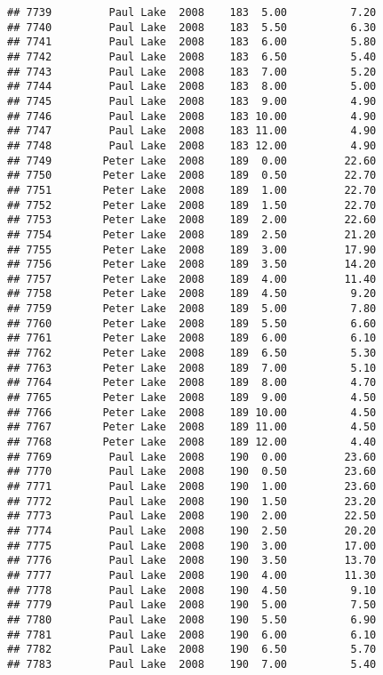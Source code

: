 \documentclass[
]{article}
\begin{document}
\begin{verbatim}
## 7739         Paul Lake  2008    183  5.00          7.20
## 7740         Paul Lake  2008    183  5.50          6.30
## 7741         Paul Lake  2008    183  6.00          5.80
## 7742         Paul Lake  2008    183  6.50          5.40
## 7743         Paul Lake  2008    183  7.00          5.20
## 7744         Paul Lake  2008    183  8.00          5.00
## 7745         Paul Lake  2008    183  9.00          4.90
## 7746         Paul Lake  2008    183 10.00          4.90
## 7747         Paul Lake  2008    183 11.00          4.90
## 7748         Paul Lake  2008    183 12.00          4.90
## 7749        Peter Lake  2008    189  0.00         22.60
## 7750        Peter Lake  2008    189  0.50         22.70
## 7751        Peter Lake  2008    189  1.00         22.70
## 7752        Peter Lake  2008    189  1.50         22.70
## 7753        Peter Lake  2008    189  2.00         22.60
## 7754        Peter Lake  2008    189  2.50         21.20
## 7755        Peter Lake  2008    189  3.00         17.90
## 7756        Peter Lake  2008    189  3.50         14.20
## 7757        Peter Lake  2008    189  4.00         11.40
## 7758        Peter Lake  2008    189  4.50          9.20
## 7759        Peter Lake  2008    189  5.00          7.80
## 7760        Peter Lake  2008    189  5.50          6.60
## 7761        Peter Lake  2008    189  6.00          6.10
## 7762        Peter Lake  2008    189  6.50          5.30
## 7763        Peter Lake  2008    189  7.00          5.10
## 7764        Peter Lake  2008    189  8.00          4.70
## 7765        Peter Lake  2008    189  9.00          4.50
## 7766        Peter Lake  2008    189 10.00          4.50
## 7767        Peter Lake  2008    189 11.00          4.50
## 7768        Peter Lake  2008    189 12.00          4.40
## 7769         Paul Lake  2008    190  0.00         23.60
## 7770         Paul Lake  2008    190  0.50         23.60
## 7771         Paul Lake  2008    190  1.00         23.60
## 7772         Paul Lake  2008    190  1.50         23.20
## 7773         Paul Lake  2008    190  2.00         22.50
## 7774         Paul Lake  2008    190  2.50         20.20
## 7775         Paul Lake  2008    190  3.00         17.00
## 7776         Paul Lake  2008    190  3.50         13.70
## 7777         Paul Lake  2008    190  4.00         11.30
## 7778         Paul Lake  2008    190  4.50          9.10
## 7779         Paul Lake  2008    190  5.00          7.50
## 7780         Paul Lake  2008    190  5.50          6.90
## 7781         Paul Lake  2008    190  6.00          6.10
## 7782         Paul Lake  2008    190  6.50          5.70
## 7783         Paul Lake  2008    190  7.00          5.40

\end{verbatim}
\end{document}
